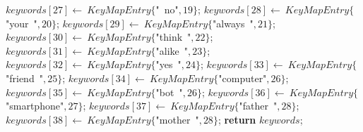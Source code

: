 \documentclass[a4paper,10pt]{article}
\begin{document}
\begin{algorithm}
\begin{algorithmic}[5]
  \State \(keywords[27]\gets\ KeyMapEntry\{\)"{}\ no"{}\(,19\}\);
  \State \(keywords[28]\gets\ KeyMapEntry\{\)"{}your\ "{}\(,20\}\);
  \State \(keywords[29]\gets\ KeyMapEntry\{\)"{}always\ "{}\(,21\}\);
  \State \(keywords[30]\gets\ KeyMapEntry\{\)"{}think\ "{}\(,22\}\);
  \State \(keywords[31]\gets\ KeyMapEntry\{\)"{}alike\ "{}\(,23\}\);
  \State \(keywords[32]\gets\ KeyMapEntry\{\)"{}yes\ "{}\(,24\}\);
  \State \(keywords[33]\gets\ KeyMapEntry\{\)"{}friend\ "{}\(,25\}\);
  \State \(keywords[34]\gets\ KeyMapEntry\{\)"{}computer"{}\(,26\}\);
  \State \(keywords[35]\gets\ KeyMapEntry\{\)"{}bot\ "{}\(,26\}\);
  \State \(keywords[36]\gets\ KeyMapEntry\{\)"{}smartphone"{}\(,27\}\);
  \State \(keywords[37]\gets\ KeyMapEntry\{\)"{}father\ "{}\(,28\}\);
  \State \(keywords[38]\gets\ KeyMapEntry\{\)"{}mother\ "{}\(,28\}\);
  \State \textbf{return} \(keywords\);
\EndFunction
\end{algorithmic}
\end{algorithm}
\end{document}

